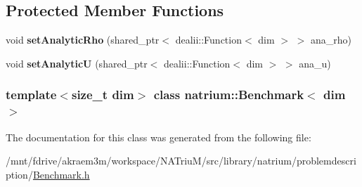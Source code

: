 \subsection*{Protected Member Functions}
\begin{DoxyCompactItemize}
\item 
\hypertarget{classnatrium_1_1Benchmark_a5232102078b3d709cf9c8a79be391ddf}{
void {\bfseries setAnalyticRho} (shared\_\-ptr$<$ dealii::Function$<$ dim $>$ $>$ ana\_\-rho)}
\label{classnatrium_1_1Benchmark_a5232102078b3d709cf9c8a79be391ddf}

\item 
\hypertarget{classnatrium_1_1Benchmark_ac61be28bab79a44b4ff32c20f6d92483}{
void {\bfseries setAnalyticU} (shared\_\-ptr$<$ dealii::Function$<$ dim $>$ $>$ ana\_\-u)}
\label{classnatrium_1_1Benchmark_ac61be28bab79a44b4ff32c20f6d92483}

\end{DoxyCompactItemize}
\subsubsection*{template$<$size\_\-t dim$>$ class natrium::Benchmark$<$ dim $>$}



The documentation for this class was generated from the following file:\begin{DoxyCompactItemize}
\item 
/mnt/fdrive/akraem3m/workspace/NATriuM/src/library/natrium/problemdescription/\hyperlink{Benchmark_8h}{Benchmark.h}\end{DoxyCompactItemize}
